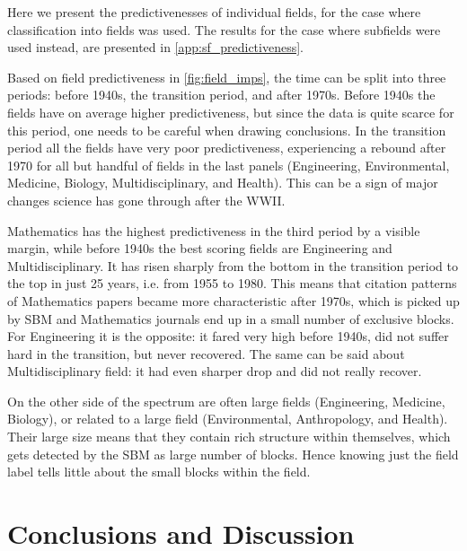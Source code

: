 \documentclass[a4paper,12pt]{article}
\begin{document}
Here we present the predictivenesses 
of individual fields, for the case where classification into fields was used.
The results for the case where subfields were used instead, are presented in \cref{app:sf_predictiveness}.

Based on field predictiveness 
in \cref{fig:field_imps}, the time can be split into three periods: before 1940s, the transition period, and after 1970s. 
Before 1940s the fields have on average higher predictiveness, 
but since the data is quite scarce for this period, one needs to be careful when drawing conclusions. In the
transition period all the fields have very poor predictiveness, experiencing a rebound after 1970 for all but handful of fields in the last panels (Engineering, Environmental, Medicine, Biology, Multidisciplinary, and Health). 
This can be a sign of major changes science has gone through after the WWII.

Mathematics has the highest predictiveness 
in the third period by a visible margin, while before 
1940s the best scoring fields are Engineering and Multidisciplinary. It has risen 
sharply from the bottom in the transition period to the top in just 25 years, i.e. from 1955 to 1980.
This means that citation patterns of Mathematics papers became more characteristic after 
1970s, which is picked up by SBM and Mathematics journals end up in a small number of 
exclusive blocks.
For Engineering it is the opposite: it fared very high before 1940s, did not suffer hard 
in the transition, but never recovered. The same can be said about Multidisciplinary 
field: it had even sharper drop and did not really recover.

On the other side of the spectrum are often large fields (Engineering, Medicine, Biology),
or related to a large field (Environmental, Anthropology, and Health).
Their large size means that they contain rich structure within themselves, 
which gets detected by the SBM as large number of blocks. Hence knowing just the field label tells little about the small blocks within the field.



\section{Conclusions and Discussion}
\label{sec:Conclusions}
\end{document}
